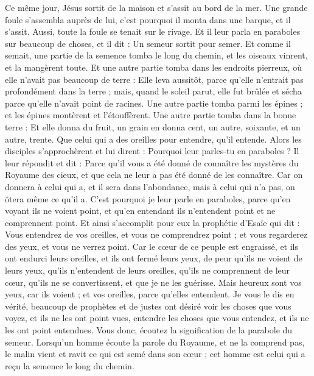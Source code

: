 \begin{multicols}{2}
\VerseOne{}Ce même jour, Jésus sortit de la maison et s'assit au bord de la mer.
Une grande foule s'assembla auprès de lui, c’est pourquoi il monta dans une barque, et il s'assit. Aussi, toute la foule se tenait sur le rivage.
Et il leur parla en paraboles sur beaucoup de choses, et il dit : Un semeur sortit pour semer.
Et comme il semait, une partie de la semence tomba le long du chemin, et les oiseaux vinrent, et la mangèrent toute.
Et une autre partie tomba dans les endroits pierreux, où elle n'avait pas beaucoup de terre : Elle leva aussitôt, parce qu'elle n'entrait pas profondément dans la terre ;
mais, quand le soleil parut, elle fut brûlée et sécha parce qu'elle n'avait point de racines.
Une autre partie tomba parmi les épines ; et les épines montèrent et l'étouffèrent.
Une autre partie tomba dans la bonne terre : Et elle donna du fruit, un grain en donna cent, un autre, soixante, et un autre, trente.
Que celui qui a des oreilles pour entendre, qu'il entende.
Alors les disciples s'approchèrent et lui dirent : Pourquoi leur parles-tu en paraboles ?
Il leur répondit et dit : Parce qu'il vous a été donné de connaître les mystères du Royaume des cieux, et que cela ne leur a pas été donné de les connaître.
Car on donnera à celui qui a, et il sera dans l’abondance, mais à celui qui n'a pas, on ôtera même ce qu’il a.
C'est pourquoi je leur parle en paraboles, parce qu'en voyant ils ne voient point, et qu'en entendant ils n'entendent point et ne comprennent point.
Et ainsi s'accomplit pour eux la prophétie d'Esaïe qui dit : Vous entendrez de vos oreilles, et vous ne comprendrez point ; et vous regarderez des yeux, et vous ne verrez point.
Car le cœur de ce peuple est engraissé, et ils ont endurci leurs oreilles, et ils ont fermé leurs yeux, de peur qu'ils ne voient de leurs yeux, qu'ils n'entendent de leurs oreilles, qu'ils ne comprennent de leur cœur, qu’ils ne se convertissent, et que je ne les guérisse{}.
Mais heureux sont vos yeux, car ils voient ; et vos oreilles, parce qu’elles entendent.
Je vous le dis en vérité, beaucoup de prophètes et de justes ont désiré voir les choses que vous voyez, et ils ne les ont point vues, entendre les choses que vous entendez, et ils ne les ont point entendues.
Vous donc, écoutez la signification de la parabole du semeur.
Lorsqu’un homme écoute la parole du Royaume, et ne la comprend pas, le malin vient et ravit ce qui est semé dans son cœur ; cet homme est celui qui a reçu la semence le long du chemin.

\end{multicols}
